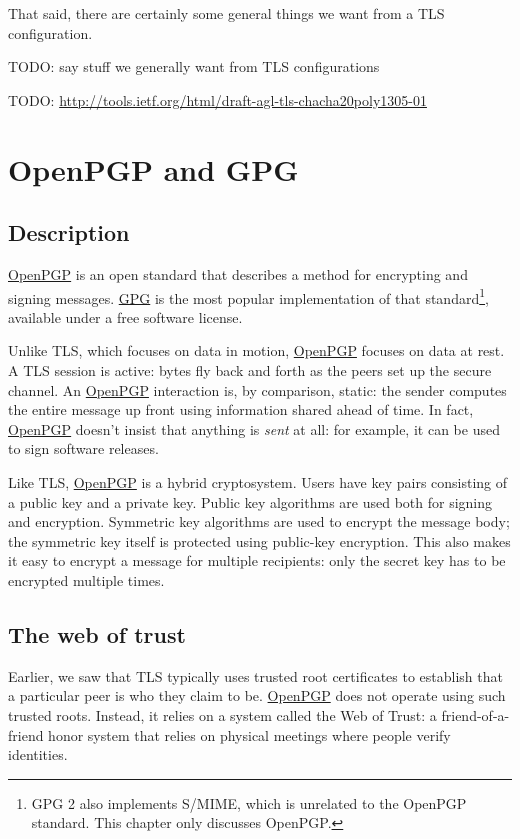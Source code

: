 \documentclass[11pt,ebook,table,dvipsnames]{memoir}
\begin{document}
That said, there are certainly some general things we want from a TLS
configuration.

TODO: say stuff we generally want from TLS configurations

TODO: \url{http://tools.ietf.org/html/draft-agl-tls-chacha20poly1305-01}
\chapter{\label{OpenPGP}OpenPGP and \label{GPG}GPG}
\label{sec-3-2}

\section{Description}
\label{sec-3-2-1}

\hyperref[OpenPGP]{OpenPGP} is an open standard that describes a method for encrypting and
signing messages. \hyperref[GPG]{GPG} is the most popular implementation of that
standard\footnote{GPG 2 also implements S/MIME, which is unrelated to the
OpenPGP standard. This chapter only discusses OpenPGP.}, available
under a free software license.

Unlike TLS, which focuses on data in motion, \hyperref[OpenPGP]{OpenPGP} focuses on data
at rest. A TLS session is active: bytes fly back and forth as the
peers set up the secure channel. An \hyperref[OpenPGP]{OpenPGP} interaction is, by
comparison, static: the sender computes the entire message up front
using information shared ahead of time. In fact, \hyperref[OpenPGP]{OpenPGP} doesn't
insist that anything is \emph{sent} at all: for example, it can be used to
sign software releases.

Like TLS, \hyperref[OpenPGP]{OpenPGP} is a hybrid cryptosystem. Users have key pairs
consisting of a public key and a private key. Public key algorithms
are used both for signing and encryption. Symmetric key algorithms are
used to encrypt the message body; the symmetric key itself is
protected using \gls{public-key encryption}. This also makes it easy
to encrypt a message for multiple recipients: only the secret key has
to be encrypted multiple times.
\section{The web of trust}
\label{sec-3-2-2}

Earlier, we saw that TLS typically uses trusted root certificates to
establish that a particular peer is who they claim to be. \hyperref[OpenPGP]{OpenPGP}
does not operate using such trusted roots. Instead, it relies on a
system called the Web of Trust: a friend-of-a-friend honor system that
relies on physical meetings where people verify identities.
\end{document}

